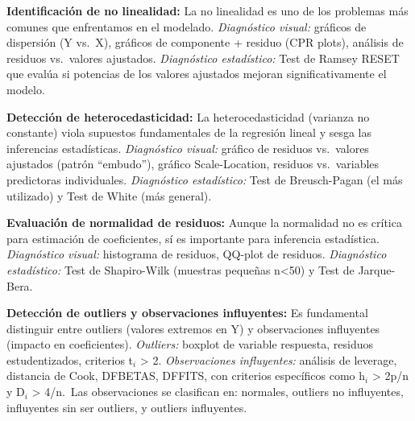 \documentclass[
  letterpaper,
  DIV=11,
  numbers=noendperiod]{scrreprt}
\begin{document}
\begin{tcolorbox}[enhanced jigsaw, breakable, toprule=.15mm, bottomtitle=1mm, coltitle=black, colbacktitle=quarto-callout-note-color!10!white, titlerule=0mm, opacitybacktitle=0.6, bottomrule=.15mm, toptitle=1mm, title=\textcolor{quarto-callout-note-color}{\faInfo}\hspace{0.5em}{Recordatorio: Diagnóstico de problemas en regresión lineal}, arc=.35mm, rightrule=.15mm, opacityback=0, colframe=quarto-callout-note-color-frame, leftrule=.75mm, left=2mm, colback=white]

\textbf{Identificación de no linealidad:} La no linealidad es uno de los
problemas más comunes que enfrentamos en el modelado. \emph{Diagnóstico
visual:} gráficos de dispersión (Y vs.~X), gráficos de componente +
residuo (CPR plots), análisis de residuos vs.~valores ajustados.
\emph{Diagnóstico estadístico:} Test de Ramsey RESET que evalúa si
potencias de los valores ajustados mejoran significativamente el modelo.

\textbf{Detección de heterocedasticidad:} La heterocedasticidad
(varianza no constante) viola supuestos fundamentales de la regresión
lineal y sesga las inferencias estadísticas. \emph{Diagnóstico visual:}
gráfico de residuos vs.~valores ajustados (patrón ``embudo''), gráfico
Scale-Location, residuos vs.~variables predictoras individuales.
\emph{Diagnóstico estadístico:} Test de Breusch-Pagan (el más utilizado)
y Test de White (más general).

\textbf{Evaluación de normalidad de residuos:} Aunque la normalidad no
es crítica para estimación de coeficientes, sí es importante para
inferencia estadística. \emph{Diagnóstico visual:} histograma de
residuos, QQ-plot de residuos. \emph{Diagnóstico estadístico:} Test de
Shapiro-Wilk (muestras pequeñas n\textless50) y Test de Jarque-Bera.

\textbf{Detección de outliers y observaciones influyentes:} Es
fundamental distinguir entre outliers (valores extremos en Y) y
observaciones influyentes (impacto en coeficientes). \emph{Outliers:}
boxplot de variable respuesta, residuos estudentizados, criterios
\textbar t\(_i\)\textbar{} \textgreater{} 2. \emph{Observaciones
influyentes:} análisis de leverage, distancia de Cook, DFBETAS, DFFITS,
con criterios específicos como h\(_i\) \textgreater{} 2p/n y D\(_i\)
\textgreater{} 4/n.~Las observaciones se clasifican en: normales,
outliers no influyentes, influyentes sin ser outliers, y outliers
influyentes.

\end{tcolorbox}
\end{document}
